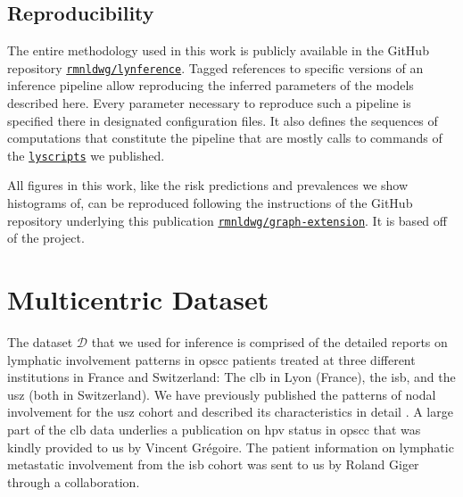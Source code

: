 \documentclass[twocolumn]{aastex631}
\begin{document}
\subsection{Reproducibility}
\label{subsec:complete_model:reproducibility}

The entire methodology used in this work is publicly available in the GitHub repository \href{https://github.com/rmnldwg/lynference}{\texttt{rmnldwg/lynference}}. Tagged references to specific versions of an inference pipeline allow reproducing the inferred parameters of the models described here. Every parameter necessary to reproduce such a pipeline is specified there in designated configuration files. It also defines the sequences of computations that constitute the pipeline that are mostly calls to commands of the \href{https://pypi.org/project/lyscripts/}{\texttt{lyscripts}} we published.

All figures in this work, like the risk predictions and prevalences we show histograms of, can be reproduced following the instructions of the GitHub repository underlying this publication \href{\GitHubURL}{\texttt{rmnldwg/graph-extension}}. It is based off of the \showyourwork project.



\section{Multicentric Dataset}
\label{sec:data}

\begin{table}
    \centering
    \caption{Prevalence of involvement patterns in the multi-centric dataset. An involvement pattern is characterized by the state of the six \glspl{lnl}: A red dot means the \gls{lnl} was reported to be metastatic, a green dot means it was determined to be healthy and a question mark means that the prevalence was marginalized over the state of this \gls{lnl}.}
    \label{table:data_prevalence}
\end{table}

The dataset $\boldsymbol{\mathcal{D}}$ that we used for inference is comprised of the detailed reports on lymphatic involvement patterns in \gls{opscc} patients treated at three different institutions in France and Switzerland: The \gls{clb} in Lyon (France), the \gls{isb}, and the \gls{usz} (both in Switzerland). We have previously published the patterns of nodal involvement for the \gls{usz} cohort \cite{ludwig_dataset_2022} and described its characteristics in detail \cite{ludwig_detailed_2022}. A large part of the \gls{clb} data underlies a publication on \gls{hpv} status in \gls{opscc} \cite{bauwens_prevalence_2021} that was kindly provided to us by Vincent Grégoire. The patient information on lymphatic metastatic involvement from the \gls{isb} cohort was sent to us by Roland Giger through a collaboration.
\end{document}
